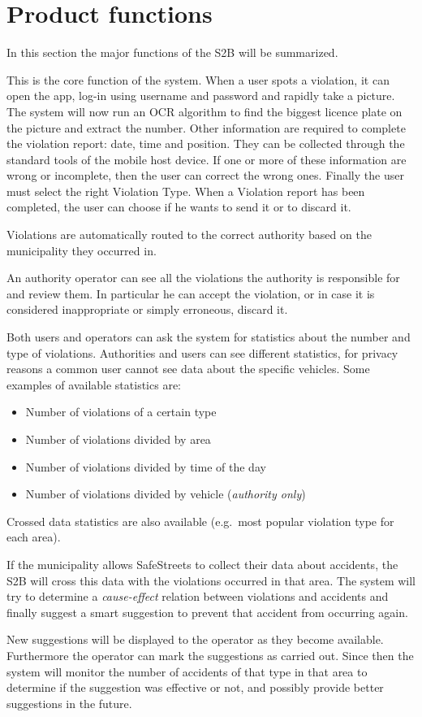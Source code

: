 \section{Product functions}
In this section the major functions of the S2B will be summarized.

This is the core function of the system. When a user spots a violation, it can
open the app, log-in using username and password and rapidly take a picture. The
system will now run an OCR algorithm to find the biggest licence plate on the
picture and extract the number. Other information are required to complete the
violation report: date, time and position. They can be collected through the
standard tools of the mobile host device. If one or more of these information
are wrong or incomplete, then the user can correct the wrong ones. Finally the
user must select the right Violation Type. When a Violation report has been
completed, the user can choose if he wants to send it or to discard it.

Violations are automatically routed to the correct authority based on the
municipality they occurred in.

An authority operator can see all the violations the authority is responsible
for and review them. In particular he can accept the violation, or in case it is
considered inappropriate or simply erroneous, discard it.

Both users and operators can ask the system for statistics about the number and
type of violations.
Authorities and users can see different statistics, for privacy reasons a common
user cannot see data about the specific vehicles.
Some examples of available statistics are:
\begin{itemize}[noitemsep]
    \item Number of violations of a certain type
    \item Number of violations divided by area
    \item Number of violations divided by time of the day
    \item Number of violations divided by vehicle (\emph{authority only})
\end{itemize}
Crossed data statistics are also available (e.g.\ most popular violation type
for each area).

If the municipality allows SafeStreets to collect their data about accidents,
the S2B will cross this data with the violations occurred in that area.
The system will try to determine a \emph{cause-effect} relation between
violations and accidents and finally suggest a smart suggestion to prevent that
accident from occurring again.

New suggestions will be displayed to the operator as they become available.
Furthermore the operator can mark the suggestions as carried out.
Since then the system will monitor the number of accidents of that type in that
area to determine if the suggestion was effective or not, and possibly provide
better suggestions in the future.